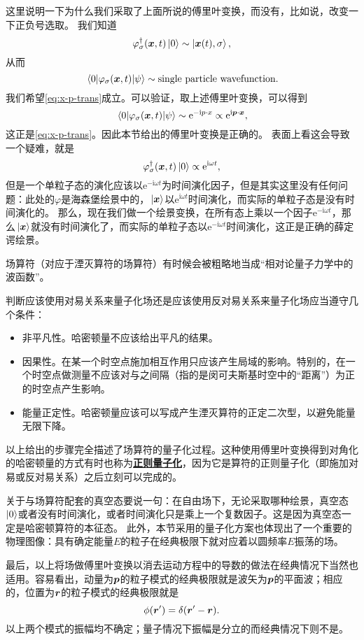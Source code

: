 \documentclass[hyperref, UTF8, a4paper]{ctexart}
\newcommand*{\ii}{\mathrm{i}}
\newcommand*{\ee}{\mathrm{e}}
\newcommand{\concept}[1]{\underline{\textbf{#1}}}
\begin{document}
这里说明一下为什么我们采取了上面所说的傅里叶变换，而没有，比如说，改变一下正负号选取。
我们知道
\[
    \varphi^\dagger_\sigma (\vb*{x}, t) \ket{0} \sim \ket{\vb*{x}(t), \sigma},
\]
从而
\[
    \mel{0}{\varphi_\sigma (\vb*{x}, t)}{\psi} \sim \text{single particle wavefunction}.
\]
我们希望\eqref{eq:x-p-trans}成立。可以验证，取上述傅里叶变换，可以得到
\[
    \mel{0}{\varphi_\sigma (\vb*{x}, t)}{\psi} \sim \ee^{-\ii p \cdot x} \propto \ee^{\ii \vb*{p} \cdot \vb*{x}},
\]
这正是\eqref{eq:x-p-trans}。因此本节给出的傅里叶变换是正确的。
表面上看这会导致一个疑难，就是
\[
    \varphi^\dagger_\sigma (\vb*{x}, t) \ket{0} \propto \ee^{\ii \omega t},
\]
但是一个单粒子态的演化应该以$\ee^{-\ii \omega t}$为时间演化因子，但是其实这里没有任何问题：此处的$\varphi$是海森堡绘景中的，$\ket*{\vb*{x}}$以$\ee^{\ii \omega t}$时间演化，而实际的单粒子态是没有时间演化的。
那么，现在我们做一个绘景变换，在所有态上乘以一个因子$\ee^{-\ii \omega t}$，那么$\ket*{\vb*{x}}$就没有时间演化了，而实际的单粒子态以$\ee^{-\ii \omega t}$时间演化，这正是正确的薛定谔绘景。

场算符（对应于湮灭算符的场算符）有时候会被粗略地当成“相对论量子力学中的波函数”。

判断应该使用对易关系来量子化场还是应该使用反对易关系来量子化场应当遵守几个条件：
\begin{itemize}
    \item 非平凡性。哈密顿量不应该给出平凡的结果。
    \item 因果性。在某一个时空点施加相互作用只应该产生局域的影响。特别的，在一个时空点做测量不应该对与之间隔（指的是闵可夫斯基时空中的“距离”）为正的时空点产生影响。
    \item 能量正定性。哈密顿量应该可以写成产生湮灭算符的正定二次型，以避免能量无限下降。
\end{itemize}

以上给出的步骤完全描述了场算符的量子化过程。这种使用傅里叶变换得到对角化的哈密顿量的方式有时也称为\concept{正则量子化}，因为它是算符的正则量子化（即施加对易或反对易关系）之后立刻可以完成的。

关于与场算符配套的真空态要说一句：在自由场下，无论采取哪种绘景，真空态$\ket{0}$或者没有时间演化，或者时间演化只是乘上一个复数因子。这是因为真空态一定是哈密顿算符的本征态。
此外，本节采用的量子化方案也体现出了一个重要的物理图像：具有确定能量$E$的粒子在经典极限下就对应着以圆频率$E$振荡的场。

最后，以上将场做傅里叶变换以消去运动方程中的导数的做法在经典情况下当然也适用。容易看出，动量为$\vb*{p}$的粒子模式的经典极限就是波矢为$\vb*{p}$的平面波；相应的，位置为$\vb*{r}$的粒子模式的经典极限就是
\[
    \phi(\vb*{r}') = \delta(\vb*{r}' - \vb*{r}).
\]
以上两个模式的振幅均不确定；量子情况下振幅是分立的而经典情况下则不是。
\end{document}
